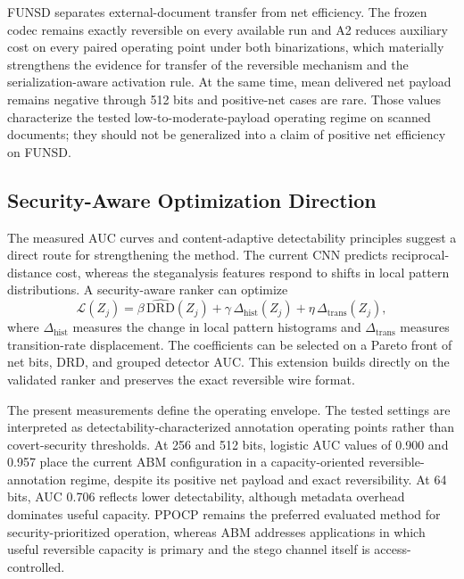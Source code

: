 \documentclass[a4paper,fleqn]{cas-dc}
\newcommand{\RevisionAddBegin}{\begingroup}
\newcommand{\RevisionAddEnd}{\endgroup}
\newcommand{\RevisionAddBegin}{\begingroup\color{revisionblue}}
\newcommand{\RevisionAddEnd}{\endgroup}
\begin{document}
\RevisionAddBegin
FUNSD separates external-document transfer from net efficiency. The frozen
codec remains exactly reversible on every available run and A2 reduces
auxiliary cost on every paired operating point under both binarizations, which
materially strengthens the evidence for transfer of the reversible mechanism
and the serialization-aware activation rule. At the same time, mean delivered
net payload remains negative through 512 bits and positive-net cases are rare.
Those values characterize the tested low-to-moderate-payload operating regime
on scanned documents; they should not be generalized into a claim of positive
net efficiency on FUNSD.
\RevisionAddEnd

\subsection{Security-Aware Optimization Direction}

\RevisionAddBegin
The measured AUC curves and content-adaptive detectability principles
\cite{Sedighi2018Content} suggest a direct route for strengthening the method.
The current CNN predicts reciprocal-distance cost, whereas the steganalysis
\RevisionAddEnd
features respond to shifts in local pattern distributions. A security-aware
ranker can optimize
\begin{equation}
\mathcal{L}(Z_j)=
\beta\,\widehat{\mathrm{DRD}}(Z_j)
+\gamma\,\Delta_{\mathrm{hist}}(Z_j)
+\eta\,\Delta_{\mathrm{trans}}(Z_j),
\label{eq:security-aware-ranker}
\end{equation}
where $\Delta_{\mathrm{hist}}$ measures the change in local pattern histograms
and $\Delta_{\mathrm{trans}}$ measures transition-rate displacement. The
coefficients can be selected on a Pareto front of net bits, DRD, and grouped
detector AUC. This extension builds directly on the validated ranker and
preserves the exact reversible wire format.

\RevisionAddBegin
The present measurements define the operating envelope. The tested settings
are interpreted as detectability-characterized annotation operating points
rather than covert-security thresholds. At 256 and 512 bits, logistic AUC
values of 0.900 and 0.957 place the current ABM configuration in a
capacity-oriented reversible-annotation regime, despite its positive net
payload and exact reversibility. At 64 bits, AUC 0.706 reflects lower
detectability, although metadata overhead dominates useful capacity. PPOCP remains the
\RevisionAddEnd
preferred evaluated method for security-prioritized operation, whereas ABM
addresses applications in which useful reversible capacity is primary and
the stego channel itself is access-controlled.
\end{document}
